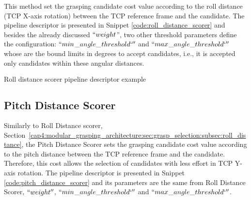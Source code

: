 This method set the grasping candidate cost value according to the roll distance (TCP X-axis rotation) between the TCP reference frame and the candidate. The pipeline descriptor is presented in Snippet \ref{code:roll_distance_scorer} and besides the already discussed $``weight$'', two other threshold parameters define the configuration: $``min$\_$angle$\_$threshold`''$ and $``max$\_$angle$\_$threshold`''$ whose are the bound limits in degrees to accept candidates, i.e., it is accepted only candidates within these angular distances.


%


\begin{snippet}[h!]
\centering
{}
\caption{Roll distance scorer pipeline descriptor example}
\label{code:roll_distance_scorer}
\end{snippet}

\subsection{Pitch Distance Scorer}
\label{cap4:modular_grasping_architecture:sec:grasp_selection:subsec:pitch_distance}

Similarly to Roll Distance scorer, Section~\ref{cap4:modular_grasping_architecture:sec:grasp_selection:subsec:roll_distance}, the Pitch Distance Scorer sets the grasping candidate cost value according to the pitch distance between the TCP reference frame and the candidate. Therefore, this cost allows the selection of candidates with less effort in TCP Y-axis rotation. The pipeline descriptor is presented in Snippet \ref{code:pitch_distance_scorer} and its parameters are the same from Roll Distance Scorer, $``weight''$, $``min$\_$angle$\_$threshold`''$ and $``max$\_$angle$\_$threshold`''$.



